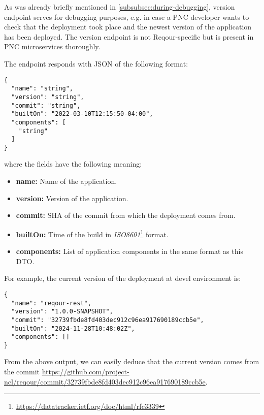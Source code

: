 \documentclass[../main.tex]{subfiles}
\begin{document}
As was already briefly mentioned in \ref{subsubsec:during-debugging}, version endpoint serves for debugging purposes, e.g. in case a PNC developer wants to check that the deployment took place and the newest version of the application has been deployed. The version endpoint is not Reqour-specific but is present in PNC microservices thoroughly.

The endpoint responds with JSON of the following format:

\begin{lstlisting}[numbers=none]
{
  "name": "string",
  "version": "string",
  "commit": "string",
  "builtOn": "2022-03-10T12:15:50-04:00",
  "components": [
    "string"
  ]
}
\end{lstlisting}

where the fields have the following meaning:
\begin{itemize}
    \item \textbf{name:} Name of the application.
    
    \item \textbf{version:} Version of the application.

    \item \textbf{commit:} SHA of the commit from which the deployment comes from.

    \item \textbf{builtOn:} Time of the build in \textit{ISO8601}\footnote{\url{https://datatracker.ietf.org/doc/html/rfc3339}} format.

    \item \textbf{components:} List of application components in the same format as this DTO.
\end{itemize}

For example, the current version of the deployment at devel environment is:
\begin{lstlisting}[numbers=none]
{
  "name": "reqour-rest",
  "version": "1.0.0-SNAPSHOT",
  "commit": "32739fbde8fd403dec912c96ea917690189ccb5e",
  "builtOn": "2024-11-28T10:48:02Z",
  "components": []
}
\end{lstlisting}

From the above output, we can easily deduce that the current version comes from the commit \url{https://github.com/project-ncl/reqour/commit/32739fbde8fd403dec912c96ea917690189ccb5e}.
\end{document}
